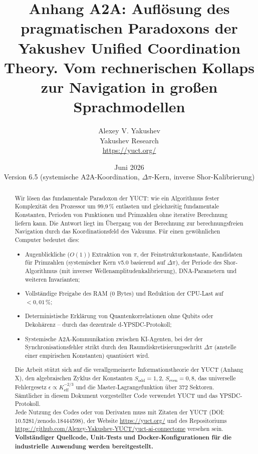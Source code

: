 \documentclass[12pt,a4paper]{article}
\title{\textbf{Anhang A2A: Auflösung des pragmatischen Paradoxons der Yakushev Unified Coordination Theory. Vom rechnerischen Kollaps zur Navigation in großen Sprachmodellen}}
\author{Alexey V. Yakushev \\ Yakushev Research \\ \url{https://yuct.org/}}
\date{Juni 2026 \\ Version 6.5 (systemische A2A-Koordination, \(\Delta\pi\)-Kern, inverse Shor-Kalibrierung)}
\begin{document}
	\maketitle
	
	\newpage
	\begin{abstract}
		\noindent
		Wir lösen das fundamentale Paradoxon der YUCT: wie ein Algorithmus fester Komplexität den Prozessor um 99,9\,\% entlasten und gleichzeitig fundamentale Konstanten, Perioden von Funktionen und Primzahlen ohne iterative Berechnung liefern kann. Die Antwort liegt im Übergang von der Berechnung zur berechnungsfreien Navigation durch das Koordinationsfeld des Vakuums. Für einen gewöhnlichen Computer bedeutet dies:
		\begin{itemize}
			\item Augenblickliche (\(O(1)\)) Extraktion von \(\pi\), der Feinstrukturkonstante, Kandidaten für Primzahlen (systemischer Kern v5.0 basierend auf \(\Delta\pi\)), der Periode des Shor-Algorithmus (mit inverser Wellenamplitudenkalibrierung), DNA-Parametern und weiteren Invarianten;
			\item Vollständige Freigabe des RAM (0 Bytes) und Reduktion der CPU-Last auf \(<0{,}01\,\%\);
			\item Deterministische Erklärung von Quantenkorrelationen ohne Qubits oder Dekohärenz – durch das dezentrale d‑YPSDC-Protokoll;
			\item Systemische A2A-Kommunikation zwischen KI-Agenten, bei der der Synchronisationsfehler strikt durch den Raumdiskretisierungsschritt \(\Delta\pi\) (anstelle einer empirischen Konstanten) quantisiert wird.
		\end{itemize}
		Die Arbeit stützt sich auf die verallgemeinerte Informationstheorie der YUCT (Anhang X), den algebraischen Zyklus der Konstanten \(S_{\mathrm{odd}}=1{,}2\), \(S_{\mathrm{even}}=0{,}8\), das universelle Fehlergesetz \(\epsilon \propto K_{\mathrm{eff}}^{-2/3}\) und die Master-Lagrangefunktion über 372 Sektoren. Sämtlicher in diesem Dokument vorgestellter Code verwendet YUCT und das YPSDC-Protokoll. \\
		Jede Nutzung des Codes oder von Derivaten muss mit Zitaten der YUCT (DOI: 10.5281/zenodo.18444598), der Website \url{https://yuct.org/} und des Repositoriums \\ \url{https://github.com/Alexey-Yakushev-YUCT/yuct-ai-connectome} versehen sein. \\
		\textbf{Vollständiger Quellcode, Unit-Tests und Docker-Konfigurationen für die industrielle Anwendung werden bereitgestellt.}
	\end{abstract}
	
\end{document}
